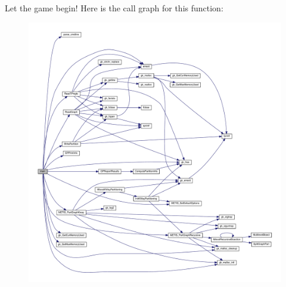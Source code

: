Let the game begin! Here is the call graph for this function\+:\nopagebreak
\begin{figure}[H]
\begin{center}
\leavevmode
\includegraphics[width=350pt]{a00311_a0ddf1224851353fc92bfbff6f499fa97_cgraph}
\end{center}
\end{figure}
